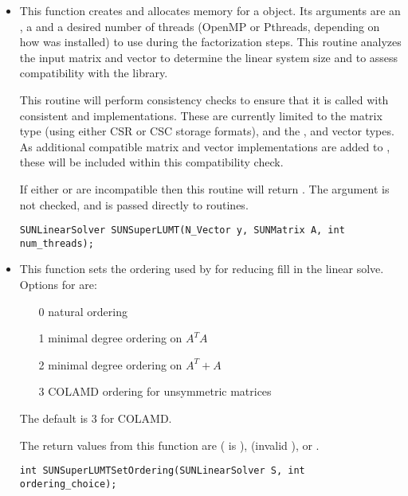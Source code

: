 \begin{itemize}


\item {}

  This function creates and allocates memory for a {\sunlinsolslumt}
  object.  Its arguments are an {\nvector}, a {\sunmatrix} and a
  desired number of threads (OpenMP or Pthreads, depending on how
  {\superlumt} was installed) to use during the factorization steps.
  This routine analyzes the input matrix and vector to determine the
  linear system size and to assess compatibility with the {\superlumt}
  library.

  This routine will perform consistency checks to ensure that it is
  called with consistent {\nvector} and {\sunmatrix} implementations.
  These are currently limited to the {\sunmatsparse} matrix type
  (using either CSR or CSC storage formats), and the {\nvecs},
  {\nvecopenmp} and {\nvecpthreads} vector types.  As additional
  compatible matrix and vector implementations are added to
  {\sundials}, these will be included within this compatibility
  check. 

  If either  or  are incompatible then this routine will
  return .  The  argument is not checked,
  and is passed directly to {\superlumt} routines.

  \verb|SUNLinearSolver SUNSuperLUMT(N_Vector y, SUNMatrix A, int num_threads);|


\item {}

  This function sets the ordering used by {\superlumt} for reducing fill in
  the linear solve.  Options for  are:
  \begin{itemize}
  \item[0] natural ordering
  \item[1] minimal degree ordering on $A^TA$
  \item[2] minimal degree ordering on $A^T+A$
  \item[3] COLAMD ordering for unsymmetric matrices
  \end{itemize}
  The default is 3 for COLAMD.

  The return values from this function are 
  ( is ), 
  (invalid ), or .
  
  \verb|int SUNSuperLUMTSetOrdering(SUNLinearSolver S, int ordering_choice);|

\end{itemize}

